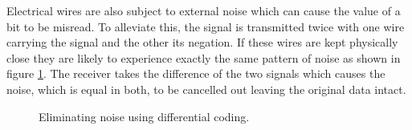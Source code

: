 			Electrical wires are also subject to external noise which can cause the
			value of a bit to be misread. To alleviate this, the signal is transmitted
			twice with one wire carrying the signal and the other its negation. If
			these wires are kept physically close they are likely to experience
			exactly the same pattern of noise as shown in figure
			\ref{fig:differential-encoding}. The receiver takes the difference of the
			two signals which causes the noise, which is equal in both, to be
			cancelled out leaving the original data intact.
			
			\begin{figure}
				\center
				
				
				\caption{Eliminating noise using differential coding.}
				\label{fig:differential-encoding}
			\end{figure}
